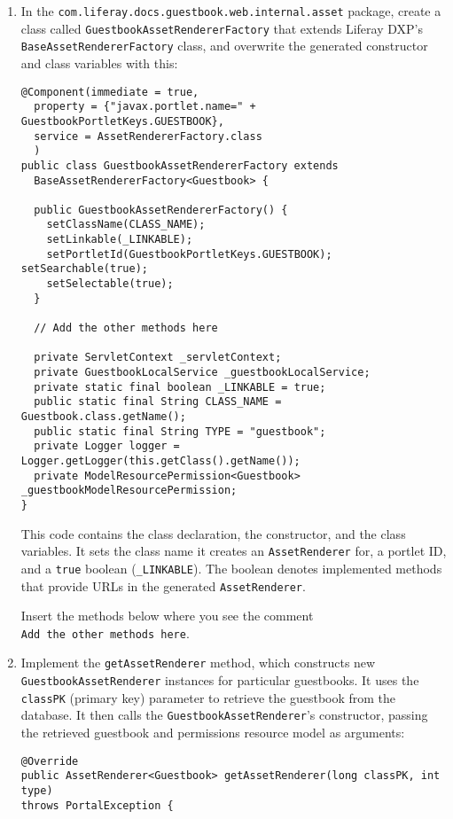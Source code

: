 \begin{enumerate}
\def\labelenumi{\arabic{enumi}.}
\item
  In the \texttt{com.liferay.docs.guestbook.web.internal.asset} package,
  create a class called \texttt{GuestbookAssetRendererFactory} that
  extends Liferay DXP's \texttt{BaseAssetRendererFactory} class, and
  overwrite the generated constructor and class variables with this:

\begin{verbatim}
@Component(immediate = true, 
  property = {"javax.portlet.name=" + GuestbookPortletKeys.GUESTBOOK}, 
  service = AssetRendererFactory.class
  )
public class GuestbookAssetRendererFactory extends 
  BaseAssetRendererFactory<Guestbook> {

  public GuestbookAssetRendererFactory() {
    setClassName(CLASS_NAME);
    setLinkable(_LINKABLE);
    setPortletId(GuestbookPortletKeys.GUESTBOOK); setSearchable(true);
    setSelectable(true); 
  }         

  // Add the other methods here

  private ServletContext _servletContext;
  private GuestbookLocalService _guestbookLocalService;
  private static final boolean _LINKABLE = true;
  public static final String CLASS_NAME = Guestbook.class.getName();
  public static final String TYPE = "guestbook";
  private Logger logger = Logger.getLogger(this.getClass().getName());
  private ModelResourcePermission<Guestbook> _guestbookModelResourcePermission;
}
\end{verbatim}

  This code contains the class declaration, the constructor, and the
  class variables. It sets the class name it creates an
  \texttt{AssetRenderer} for, a portlet ID, and a \texttt{true} boolean
  (\texttt{\_LINKABLE}). The boolean denotes implemented methods that
  provide URLs in the generated \texttt{AssetRenderer}.

  Insert the methods below where you see the comment
  \texttt{Add\ the\ other\ methods\ here}.
\item
  Implement the \texttt{getAssetRenderer} method, which constructs new
  \texttt{GuestbookAssetRenderer} instances for particular guestbooks.
  It uses the \texttt{classPK} (primary key) parameter to retrieve the
  guestbook from the database. It then calls the
  \texttt{GuestbookAssetRenderer}'s constructor, passing the retrieved
  guestbook and permissions resource model as arguments:

\begin{verbatim}
@Override
public AssetRenderer<Guestbook> getAssetRenderer(long classPK, int type) 
throws PortalException {


\end{verbatim}
\end{enumerate}
